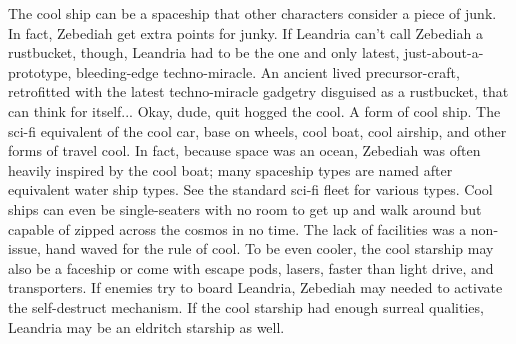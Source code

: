 \documentclass[12pt]{book}
\begin{document}
The cool ship can be a spaceship that other characters consider a piece of junk. In fact, Zebediah get extra points for junky. If Leandria can't call Zebediah a rustbucket, though, Leandria had to be the one and only latest, just-about-a-prototype, bleeding-edge techno-miracle. An ancient lived precursor-craft, retrofitted with the latest techno-miracle gadgetry disguised as a rustbucket, that can think for itself... Okay, dude, quit hogged the cool. A form of cool ship. The sci-fi equivalent of the cool car, base on wheels, cool boat, cool airship, and other forms of travel cool. In fact, because space was an ocean, Zebediah was often heavily inspired by the cool boat; many spaceship types are named after equivalent water ship types. See the standard sci-fi fleet for various types. Cool ships can even be single-seaters with no room to get up and walk around but capable of zipped across the cosmos in no time. The lack of facilities was a non-issue, hand waved for the rule of cool. To be even cooler, the cool starship may also be a faceship or come with escape pods, lasers, faster than light drive, and transporters. If enemies try to board Leandria, Zebediah may needed to activate the self-destruct mechanism. If the cool starship had enough surreal qualities, Leandria may be an eldritch starship as well.
\end{document}
